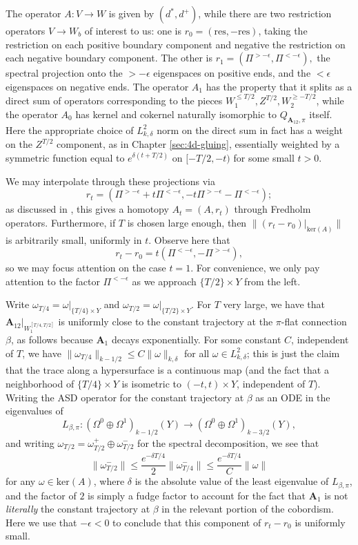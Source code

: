 \documentclass{memo-l}
\theoremstyle{definition}
\theoremstyle{remark}
\numberwithin{section}{chapter}
\numberwithin{equation}{chapter}
\begin{document}
The operator $A: V \to W$ is given by $(d^*, d^+)$, while there are two restriction operators $V \to W_b$ of interest to us: one is $r_0 = (\text{res}, -\text{res})$, taking the restriction on each positive boundary component and negative the restriction on each negative boundary component. The other is $r_1 = (\Pi^{>-\epsilon}, \Pi^{<-\epsilon}),$ the spectral projection onto the $>-\epsilon$ eigenspaces on positive ends, and the $<\epsilon$ eigenspaces on negative ends. The operator $A_1$ has the property that it splits as a direct sum of operators corresponding to the pieces $W_1^{\leq T/2}, Z^{T/2}, W_2^{\geq -T/2}$, while the operator $A_0$ has kernel and cokernel naturally isomorphic to $Q_{\mathbf{A}_{12},\pi}$ itself. Here the appropriate choice of $L^2_{k,\delta}$ norm on the direct sum in fact has a weight on the $Z^{T/2}$ component, as in Chapter \ref{sec:4d-gluing}, essentially weighted by a symmetric function equal to $e^{\delta(t+T/2)}$ on $[-T/2, -t)$ for some small $t >0$.

We may interpolate through these projections via 
$$r_t = (\Pi^{>-\epsilon} + t\Pi^{<-\epsilon}, -t\Pi^{>-\epsilon} - \Pi^{< -\epsilon});$$ 
as discussed in \cite[Section~20.3]{KMSW}, this gives a homotopy $A_t = (A, r_t)$ through Fredholm operators. Furthermore, if $T$ is chosen large enough, then $\|(r_t - r_0)\big|_{\text{ker}(A)}\|$ is arbitrarily small, uniformly in $t$. Observe here that 
$$r_t - r_0 = t(\Pi^{<-\epsilon},-\Pi^{>-\epsilon}),$$ 
so we may focus attention on the case $t = 1$. For convenience, we only pay attention to the factor $\Pi^{<-\epsilon}$ as we approach $\{T/2\} \times Y$ from the left.

Write $\omega_{T/4} = \omega\big|_{\{T/4\} \times Y}$ and $\omega_{T/2} = \omega\big|_{\{T/2\} \times Y}$. For $T$ very large, we have that $\mathbf{A}_{12} \big|_{W_1^{[T/4, T/2]}}$ is uniformly close to the constant trajectory at the $\pi$-flat connection $\beta$, as follows because $\mathbf{A}_1$ decays exponentially. For some constant $C$, independent of $T$, we have $\|\omega_{T/4}\|_{k-1/2} \leq C\|\omega\|_{k,\delta}$ for all $\omega \in L^2_{k,\delta}$; this is just the claim that the trace along a hypersurface is a continuous map (and the fact that a neighborhood of $\{T/4\} \times Y$ is isometric to $(-t, t) \times Y$, independent of $T$). Writing the ASD operator for the constant trajectory at $\beta$ as an ODE in the eigenvalues of 
$$L_{\beta, \pi}: (\Omega^0\oplus \Omega^1)_{k-1/2}(Y) \to (\Omega^0 \oplus \Omega^1)_{k-3/2}(Y),$$ 
and writing $\omega_{T/2} = \omega^+_{T/2} \oplus \omega^-_{T/2}$ for the spectral decomposition, we see that $$\|\omega_{T/2}^-\| \leq \frac{e^{-\delta T/4}}{2} \|\omega_{T/4}^-\| \leq \frac{e^{-\delta T/4}}{C} \|\omega\|$$ for any $\omega \in \text{ker}(A)$, where $\delta$ is the absolute value of the least eigenvalue of $L_{\beta, \pi}$, and the factor of $2$ is simply a fudge factor to account for the fact that $\mathbf{A}_1$ is not \emph{literally} the constant trajectory at $\beta$ in the relevant portion of the cobordism. Here we use that $-\epsilon < 0$ to conclude that this component of $r_t - r_0$ is uniformly small.
\end{document}
